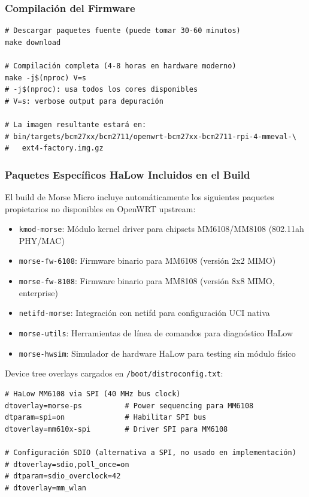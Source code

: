 \subsubsection{Compilación del Firmware}

\begin{verbatim}
# Descargar paquetes fuente (puede tomar 30-60 minutos)
make download

# Compilación completa (4-8 horas en hardware moderno)
make -j$(nproc) V=s
# -j$(nproc): usa todos los cores disponibles
# V=s: verbose output para depuración

# La imagen resultante estará en:
# bin/targets/bcm27xx/bcm2711/openwrt-bcm27xx-bcm2711-rpi-4-mmeval-\
#   ext4-factory.img.gz
\end{verbatim}

\subsubsection{Paquetes Específicos HaLow Incluidos en el Build}

El build de Morse Micro incluye automáticamente los siguientes paquetes propietarios no disponibles en OpenWRT upstream:

\begin{itemize}
    \item \texttt{kmod-morse}: Módulo kernel driver para chipsets MM6108/MM8108 (802.11ah PHY/MAC)
    \item \texttt{morse-fw-6108}: Firmware binario para MM6108 (versión 2x2 MIMO)
    \item \texttt{morse-fw-8108}: Firmware binario para MM8108 (versión 8x8 MIMO, enterprise)
    \item \texttt{netifd-morse}: Integración con netifd para configuración UCI nativa
    \item \texttt{morse-utils}: Herramientas de línea de comandos para diagnóstico HaLow
    \item \texttt{morse-hwsim}: Simulador de hardware HaLow para testing sin módulo físico
\end{itemize}

Device tree overlays cargados en \texttt{/boot/distroconfig.txt}:
\begin{verbatim}
# HaLow MM6108 via SPI (40 MHz bus clock)
dtoverlay=morse-ps          # Power sequencing para MM6108
dtparam=spi=on              # Habilitar SPI bus
dtoverlay=mm610x-spi        # Driver SPI para MM6108

# Configuración SDIO (alternativa a SPI, no usado en implementación)
# dtoverlay=sdio,poll_once=on
# dtparam=sdio_overclock=42
# dtoverlay=mm_wlan
\end{verbatim}

